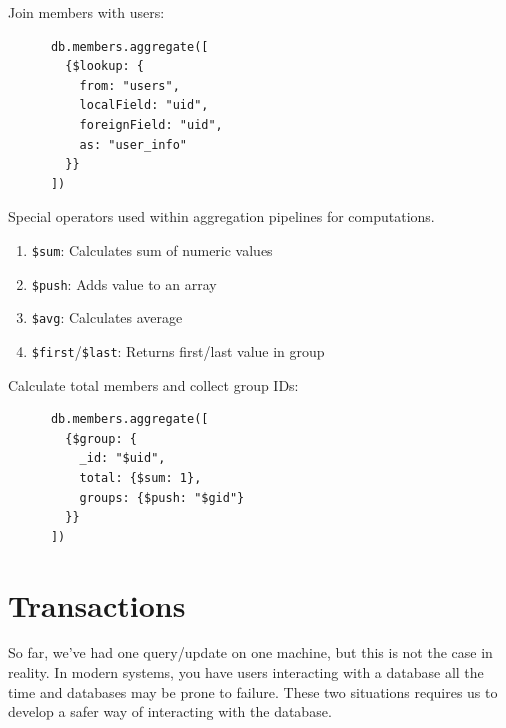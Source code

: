 \documentclass{article}
\begin{document}
  \begin{example}
    Join members with users:
    \begin{lstlisting}
      db.members.aggregate([
        {$lookup: {
          from: "users",
          localField: "uid",
          foreignField: "uid",
          as: "user_info"
        }}
      ])
    \end{lstlisting}
  \end{example}

  \begin{definition}
    Special operators used within aggregation pipelines for computations.
    \begin{enumerate}
      \item \texttt{\$sum}: Calculates sum of numeric values
      \item \texttt{\$push}: Adds value to an array
      \item \texttt{\$avg}: Calculates average
      \item \texttt{\$first}/\texttt{\$last}: Returns first/last value in group
    \end{enumerate}
  \end{definition}

  \begin{example}
    Calculate total members and collect group IDs:
    \begin{lstlisting}
      db.members.aggregate([
        {$group: {
          _id: "$uid",
          total: {$sum: 1},
          groups: {$push: "$gid"}
        }}
      ])
    \end{lstlisting}
  \end{example}

\section{Transactions} 

    So far, we've had one query/update on one machine, but this is not the case in reality. In modern systems, you have users interacting with a database all the time and databases may be prone to failure. These two situations requires us to develop a safer way of interacting with the database. 
\end{document}
